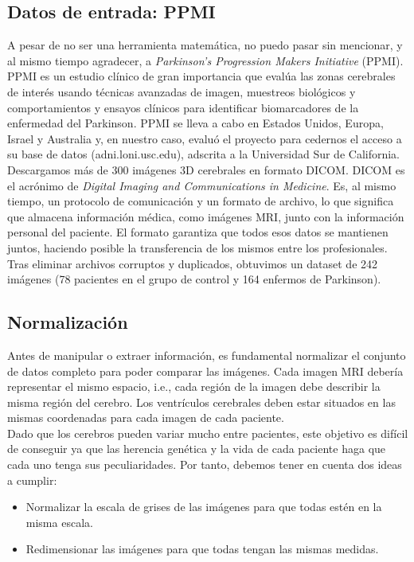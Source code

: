 \subsection{Datos de entrada: PPMI}

A pesar de no ser una herramienta matemática, no puedo pasar sin mencionar, y al mismo tiempo agradecer, a \textit{Parkinson's Progression Makers Initiative} (PPMI). PPMI es un estudio clínico de gran importancia que evalúa las zonas cerebrales de interés usando técnicas avanzadas de imagen, muestreos biológicos y comportamientos y ensayos clínicos para identificar biomarcadores de la enfermedad del Parkinson. PPMI se lleva a cabo en Estados Unidos, Europa, Israel y Australia y, en nuestro caso, evaluó el proyecto para cedernos el acceso a su base de datos (adni.loni.usc.edu), adscrita a la Universidad Sur de California. \\

Descargamos más de 300 imágenes 3D cerebrales en formato DICOM. DICOM es el acrónimo de \textit{Digital Imaging and Communications in Medicine}. Es, al mismo tiempo, un protocolo de comunicación y un formato de archivo, lo que significa que almacena información médica, como imágenes MRI, junto con la información personal del paciente. El formato garantiza que todos esos datos se mantienen juntos, haciendo posible la transferencia de los mismos entre los profesionales. Tras eliminar archivos corruptos y duplicados, obtuvimos un dataset de 242 imágenes (78 pacientes en el grupo de control y 164 enfermos de Parkinson). 


\subsection{Normalización}

Antes de manipular o extraer información, es fundamental normalizar el conjunto de datos completo para poder comparar las imágenes. Cada imagen MRI debería representar el mismo espacio, i.e., cada región de la imagen debe describir la misma región del cerebro. Los ventrículos cerebrales deben estar situados en las mismas coordenadas para cada imagen de cada paciente. \\

Dado que los cerebros pueden variar mucho entre pacientes, este objetivo es difícil de conseguir ya que las herencia genética y la vida de cada paciente haga que cada uno tenga sus peculiaridades. Por tanto, debemos tener en cuenta dos ideas a cumplir:

\begin{itemize}
	\item Normalizar la escala de grises de las imágenes para que todas estén en la misma escala.
	\item Redimensionar las imágenes para que todas tengan las mismas medidas.
\end{itemize}


